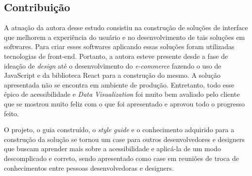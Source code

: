  
\subsection{Contribuição}
{

 A atuação da autora desse estudo consistiu na construção de soluções de interface que melhorem a experiência do usuário e no desenvolvimento de tais soluções em softwares. Para criar esses softwares aplicando essas soluções foram utilizadas tecnologias de front-end. Portanto, a autora esteve presente desde a fase de ideação de \textit{design} até o desenvolvimento do \textit{e-commerce} fazendo o uso de JavaScript e da biblioteca React \cite{REACT} para a construção do mesmo. A solução apresentada não se encontra em ambiente de produção. Entretanto, todo esse épico de acessibilidade e \textit{Data Visualization} foi muito bem avaliado pelo cliente que se mostrou muito feliz com o que foi apresentado e aprovou todo o progresso feito.

O projeto, o guia construído, o \textit{style guide} \cite{STYLE} e o conhecimento adquirido para a construção da solução se tornou um case para outros desenvolvedores e designers que buscam aprender mais sobre a acessibilidade e aplicá-la de um modo descomplicado e correto, sendo apresentado como case em reuniões de troca de conhecimentos entre pessoas desenvolvedoras e designers.  

}